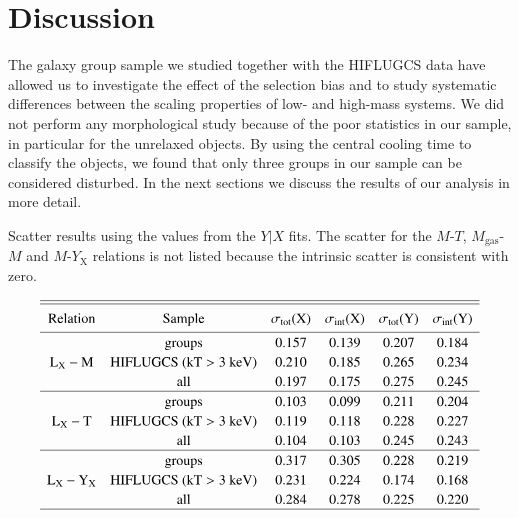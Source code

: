 \documentclass{aa} %
\begin{document}
\section{Discussion} \label{sec_discussion} 
The galaxy group sample we
studied together with the HIFLUGCS data have allowed us
to investigate the effect of the selection bias and to study
systematic differences between the scaling properties of low- and high-mass systems. We did not perform any
morphological study because of the poor statistics in our sample, in
particular for the unrelaxed objects. By using the central
cooling time to classify the objects, we found that only three groups in our
sample can be considered disturbed.  
In the next sections we discuss the results of our analysis in more detail.\\


\begin{table}[!t]
\caption{Scatter results using the values from the $Y|X$ fits. The scatter for the $M$-$T$, $M_{\text{gas}}$-$M$ and $M$-$Y_{\text{X}}$ relations is not listed because the intrinsic scatter is consistent with zero. }
$$
\centering
\setlength\extrarowheight{2pt}
\begin{array}{cccccc}
\hline\hline
\noalign{\smallskip}
{\rm Relation} & {\rm Sample} & {\rm \sigma_{tot}(X)} & {\rm \sigma_{int}(X)} & {\rm \sigma_{tot}(Y)}  & {\rm \sigma_{int}(Y)} \\ 
\noalign{\smallskip}
\hline
								 & {\rm groups} 					& 0.157 & 0.139 & 0.207 & 0.184 \\
{\rm L_{\text{X}}-M} 			 & {\rm HIFLUGCS \ (kT>3 \ keV)}	& 0.210 & 0.185 & 0.265 & 0.234 \\
	 		 	  				 & {\rm all} 						& 0.197 & 0.175 & 0.275 & 0.245 \\
\hline
					 			 & {\rm groups}  					& 0.103 & 0.099 & 0.211 & 0.204 \\
{\rm L_{\text{X}}-T}			 & {\rm HIFLUGCS \ (kT>3 \ keV)}	& 0.119 & 0.118 & 0.228 & 0.227 \\
	 		 					 & {\rm all}						& 0.104 & 0.103 & 0.245 & 0.243 \\ 
\hline
					 			 & {\rm groups}  					& 0.317 & 0.305 & 0.228 & 0.219 \\
{\rm L_{\text{X}}-Y_{\text{X}}}  & {\rm HIFLUGCS \ (kT>3 \ keV)}    & 0.231 & 0.224 & 0.174 & 0.168 \\
	 		 	  				 & {\rm all}					 	& 0.284 & 0.278 & 0.225 & 0.220 \\
\hline 
\end{array}
\label{tab:scatter}
$$
\end{table}
\end{document}
